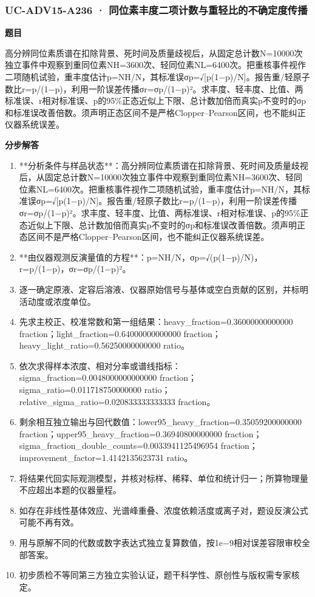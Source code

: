 \documentclass[UTF8,11pt,a4paper]{ctexart}
\begin{document}
\subsubsection*{UC-ADV15-A236 · 同位素丰度二项计数与重轻比的不确定度传播}
\noindent\textbf{题目}\par
高分辨同位素质谱在扣除背景、死时间及质量歧视后，从固定总计数N=10000次独立事件中观察到重同位素NH=3600次、轻同位素NL=6400次。把重核事件视作二项随机试验，重丰度估计p=NH/N，其标准误σp=√[p(1−p)/N]。报告重/轻原子数比r=p/(1−p)，利用一阶误差传播σr=σp/(1−p)²。求丰度、轻丰度、比值、两标准误、r相对标准误、p的95\%正态近似上下限、总计数加倍而真实p不变时的σp和标准误改善倍数。须声明正态区间不是严格Clopper–Pearson区间，也不能纠正仪器系统误差。\par
\medskip\noindent\textbf{分步解答}
\begin{enumerate}
\item **分析条件与样品状态**：高分辨同位素质谱在扣除背景、死时间及质量歧视后，从固定总计数N=10000次独立事件中观察到重同位素NH=3600次、轻同位素NL=6400次。把重核事件视作二项随机试验，重丰度估计p=NH/N，其标准误σp=√[p(1−p)/N]。报告重/轻原子数比r=p/(1−p)，利用一阶误差传播σr=σp/(1−p)²。求丰度、轻丰度、比值、两标准误、r相对标准误、p的95\%正态近似上下限、总计数加倍而真实p不变时的σp和标准误改善倍数。须声明正态区间不是严格Clopper–Pearson区间，也不能纠正仪器系统误差。
\item **由仪器观测反演量值的方程**：p=NH/N，σp=√(p(1−p)/N)，r=p/(1−p)，σr=σp/(1−p)²。
\item 逐一确定原液、定容后溶液、仪器原始信号与基体或空白贡献的区别，并标明活动度或浓度单位。
\item 先求主校正、校准常数和第一组结果：heavy\_fraction=0.36000000000000 fraction；light\_fraction=0.64000000000000 fraction；heavy\_light\_ratio=0.56250000000000 ratio。
\item 依次求得样本浓度、相对分率或谱线指标：sigma\_fraction=0.0048000000000000 fraction；sigma\_ratio=0.011718750000000 ratio；relative\_sigma\_ratio=0.020833333333333 fraction。
\item 剩余相互独立输出与回代数值：lower95\_heavy\_fraction=0.35059200000000 fraction；upper95\_heavy\_fraction=0.36940800000000 fraction；sigma\_fraction\_double\_counts=0.0033941125496954 fraction；improvement\_factor=1.4142135623731 ratio。
\item 将结果代回实际观测模型，并核对标样、稀释、单位和统计归一；所算物理量不应超出本题的仪器量程。
\item 如存在非线性基体效应、光谱峰重叠、浓度依赖活度或离子对，题设反演公式可能不再有效。
\item 用与原解不同的代数或数字表达式独立复算数值，按1e−9相对误差容限审校全部答案。
\item 初步质检不等同第三方独立实验认证，题干科学性、原创性与版权需专家核定。
\end{enumerate}
\end{document}
